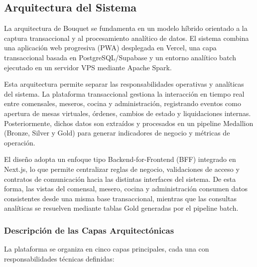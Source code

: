 \subsection{Arquitectura del Sistema}

La arquitectura de Bouquet se fundamenta en un modelo híbrido orientado a la
captura transaccional y al procesamiento analítico de datos. El sistema combina
una aplicación web progresiva (PWA) desplegada en Vercel, una capa transaccional
basada en PostgreSQL/Supabase y un entorno analítico batch ejecutado en un servidor
VPS mediante Apache Spark.

Esta arquitectura permite separar las responsabilidades operativas y analíticas
del sistema. La plataforma transaccional gestiona la interacción en tiempo real
entre comensales, meseros, cocina y administración, registrando eventos como
apertura de mesas virtuales, órdenes, cambios de estado y liquidaciones internas.
Posteriormente, dichos datos son extraídos y procesados en un pipeline Medallion
(Bronze, Silver y Gold) para generar indicadores de negocio y métricas de operación.

El diseño adopta un enfoque tipo Backend-for-Frontend (BFF) integrado en Next.js,
lo que permite centralizar reglas de negocio, validaciones de acceso y contratos
de comunicación hacia las distintas interfaces del sistema. De esta forma, las
vistas del comensal, mesero, cocina y administración consumen datos consistentes
desde una misma base transaccional, mientras que las consultas analíticas se
resuelven mediante tablas Gold generadas por el pipeline batch.

\subsubsection{Descripción de las Capas Arquitectónicas}

La plataforma se organiza en cinco capas principales, cada una con responsabilidades
técnicas definidas:


